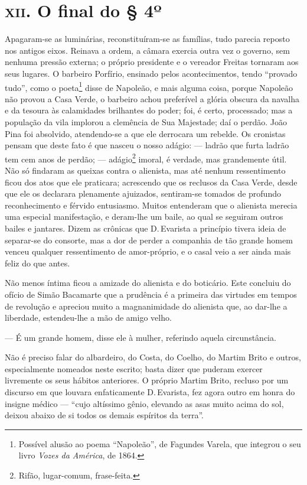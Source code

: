 \chapter{\textsc{xii}. O final do § 4º }

Apagaram-se as luminárias, reconstituíram-se as famílias, tudo parecia
reposto nos antigos eixos. Reinava a ordem, a câmara exercia outra vez o
governo, sem nenhuma pressão externa; o próprio presidente e o vereador
Freitas tornaram aos seus lugares. O barbeiro Porfírio, ensinado pelos
acontecimentos, tendo ``provado tudo'', como o poeta\footnote{Possível
  alusão ao poema ``Napoleão'', de Fagundes Varela, que integrou o seu
  livro \emph{Vozes da América}, de 1864.} disse de Napoleão, e mais
alguma coisa, porque Napoleão não provou a Casa Verde, o barbeiro achou
preferível a glória obscura da navalha e da tesoura às calamidades
brilhantes do poder; foi, é certo, processado; mas a população da vila
implorou a clemência de Sua Majestade; daí o perdão. João Pina foi
absolvido, atendendo-se a que ele derrocara um rebelde. Os cronistas
pensam que deste fato é que nasceu o nosso adágio: --- ladrão que furta
ladrão tem cem anos de perdão; --- adágio\footnote{Rifão, lugar-comum,
  frase-feita.} imoral, é verdade, mas grandemente útil. Não só findaram
as queixas contra o alienista, mas até nenhum ressentimento ficou dos
atos que ele praticara; acrescendo que os reclusos da Casa Verde, desde
que ele os declarara plenamente ajuizados, sentiram-se tomados de
profundo reconhecimento e férvido entusiasmo. Muitos entenderam que o
alienista merecia uma especial manifestação, e deram-lhe um baile, ao
qual se seguiram outros bailes e jantares. Dizem as crônicas que D.\,Evarista a princípio tivera ideia de separar-se do consorte, mas a dor
de perder a companhia de tão grande homem venceu qualquer ressentimento
de amor-próprio, e o casal veio a ser ainda mais feliz do que antes.

Não menos íntima ficou a amizade do alienista e do boticário. Este
concluiu do ofício de Simão Bacamarte que a prudência é a primeira das
virtudes em tempos de revolução e apreciou muito a magnanimidade do
alienista que, ao dar-lhe a liberdade, estendeu-lhe a mão de amigo
velho.

--- É um grande homem, disse ele à mulher, referindo aquela
circunstância.

Não é preciso falar do albardeiro, do Costa, do Coelho, do Martim Brito
e outros, especialmente nomeados neste escrito; basta dizer que puderam
exercer livremente os seus hábitos anteriores. O próprio Martim Brito,
recluso por um discurso em que louvara enfaticamente D.\,Evarista, fez
agora outro em honra do insigne médico --- ``cujo altíssimo gênio,
elevando as asas muito acima do sol, deixou abaixo de si todos os demais
espíritos da terra''.

